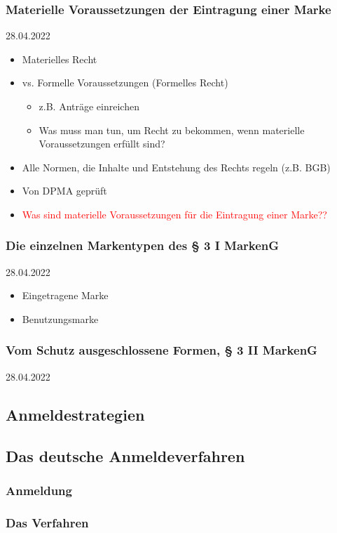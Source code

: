 \documentclass{report}
\begin{document}
\subsubsection{Materielle Voraussetzungen der Eintragung einer Marke}
28.04.2022
\begin{itemize}
	\item Materielles Recht
	\item vs. Formelle Voraussetzungen (Formelles Recht)
	\begin{itemize}
		\item z.B. Anträge einreichen
		\item Was muss man tun, um Recht zu bekommen, wenn materielle Voraussetzungen erfüllt sind?
	\end{itemize}
	\item Alle Normen, die Inhalte und Entstehung des Rechts regeln (z.B. BGB)
	\item Von DPMA geprüft
	\item \textcolor{red}{Was sind materielle Voraussetzungen für die Eintragung einer Marke??}
\end{itemize}

\subsubsection{Die einzelnen Markentypen des § 3 I MarkenG}
28.04.2022
\begin{itemize}
	\item Eingetragene Marke
	\item Benutzungsmarke
\end{itemize}

\subsubsection{Vom Schutz ausgeschlossene Formen, § 3 II MarkenG} \label{marke-schutzhindernis}
28.04.2022

\subsection{Anmeldestrategien}
\subsection{Das deutsche Anmeldeverfahren}
\subsubsection{Anmeldung}
\subsubsection{Das Verfahren}
\end{document}
